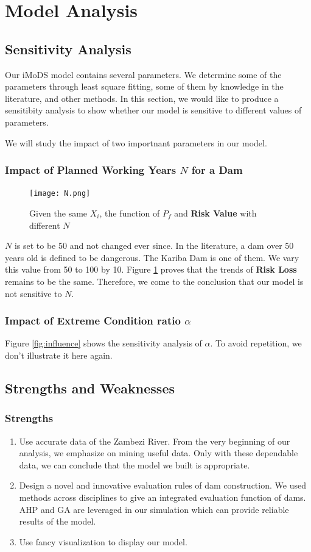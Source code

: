 \documentclass{mcmthesis}
\begin{document}
\section{Model Analysis}\label{Sec-Analysis}

\subsection{Sensitivity Analysis}
Our iMoDS model contains several parameters. We determine some of the parameters through least square fitting, some of them by knowledge in the literature, and other methods. In this section, we would like to produce a sensitibity analysis to show whether our model is sensitive to different values of parameters.

We will study the impact of two importnant parameters in our model.
\subsubsection{Impact of Planned Working Years $N$ for a Dam}
\begin{figure}[h]
    \centering
    \texttt{[image: N.png]}
    \caption{Given the same $X_i$, the function of \textbf{$P_f$} and \textbf{Risk Value} with different $N$}
    \label{fig:N}
\end{figure}
$N$ is set to be 50 and not changed ever since. In the literature, a dam over 50 years old is defined to be dangerous. The Kariba Dam is one of them. We vary this value from 50 to 100 by 10. Figure \ref{fig:N} proves  that the trends of \textbf{Risk Loss} remains to be the same. Therefore, we come to the conclusion that our model is not sensitive to $N$.
\subsubsection{Impact of Extreme Condition ratio $\alpha$}
Figure \ref{fig:influence} shows the sensitivity analysis of $\alpha$. To avoid repetition, we don't illustrate it here again.
\subsection{Strengths and Weaknesses}
\subsubsection{Strengths}
\begin{enumerate}
\item Use accurate data of the Zambezi River. From the very beginning of our analysis, we emphasize on mining useful data. Only with these dependable data, we can conclude that the model we built is appropriate.
\item Design a novel and innovative evaluation rules of dam construction. We used methods across disciplines to give an integrated evaluation function of dams. AHP and GA are leveraged in our simulation which can provide reliable results of the model.
\item Use fancy visualization to display our model.
\end{enumerate}
\end{document}
